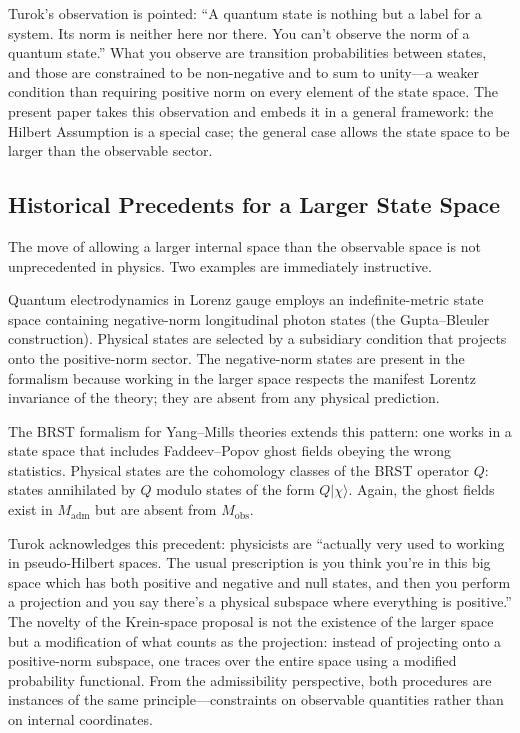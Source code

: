 \documentclass[12pt,a4paper]{article}
\theoremstyle{remark}
\begin{document}
Turok's observation is pointed: ``A quantum state is nothing but a label
for a system. Its norm is neither here nor there. You can't observe the
norm of a quantum state.'' What you observe are transition probabilities
between states, and those are constrained to be non-negative and to sum
to unity---a weaker condition than requiring positive norm on every element
of the state space. The present paper takes this observation and embeds it
in a general framework: the Hilbert Assumption is a special case; the
general case allows the state space to be larger than the observable sector.

\subsection{Historical Precedents for a Larger State Space}

The move of allowing a larger internal space than the observable space is
not unprecedented in physics. Two examples are immediately instructive.

Quantum electrodynamics in Lorenz gauge employs an indefinite-metric state
space containing negative-norm longitudinal photon states (the Gupta--Bleuler
construction). Physical states are selected by a subsidiary condition that
projects onto the positive-norm sector. The negative-norm states are
present in the formalism because working in the larger space respects the
manifest Lorentz invariance of the theory; they are absent from any
physical prediction.

The BRST formalism for Yang--Mills theories extends this pattern: one
works in a state space that includes Faddeev--Popov ghost fields obeying
the wrong statistics. Physical states are the cohomology classes of the
BRST operator $Q$: states annihilated by $Q$ modulo states of the form
$Q\lvert\chi\rangle$. Again, the ghost fields exist in $M_{\mathrm{adm}}$
but are absent from $M_{\mathrm{obs}}$.

Turok acknowledges this precedent: physicists are ``actually very used
to working in pseudo-Hilbert spaces. The usual prescription is you think
you're in this big space which has both positive and negative and null
states, and then you perform a projection and you say there's a physical
subspace where everything is positive.'' The novelty of the Krein-space
proposal is not the existence of the larger space but a modification of
what counts as the projection: instead of projecting onto a positive-norm
subspace, one traces over the entire space using a modified probability
functional. From the admissibility perspective, both procedures are
instances of the same principle---constraints on observable quantities
rather than on internal coordinates.
\end{document}
